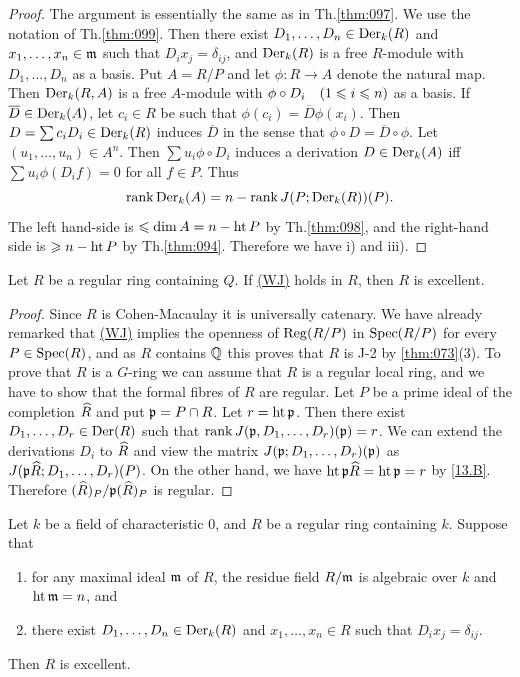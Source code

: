 \documentclass[../main]{subfiles}
\begin{document}
\begin{proof}
The argument is essentially the same as in Th.\ref{thm:097}. We use the notation of Th.\ref{thm:099}. Then there exist $D_1, \dots, D_n \in \operatorname{Der}_k(R)$ and $x_1, \dots, x_n \in \mathfrak{m}$ such that $D_i x_j = \delta_{ij}$, and $\operatorname{Der}_k(R)$ is a free $R$-module with $D_1, \ldots, D_n$ as a basis. Put $A = R/P$ and let $\phi : R \longrightarrow A$ denote the natural map. Then $\operatorname{Der}_k(R, A)$ is a free $A$-module with $\phi \circ D_i\for{1 \le i \le n}$ as a basis. If $\overline D \in \operatorname{Der}_k(A)$, let $c_i \in R$ be such that $\phi(c_i) = \overline D \phi(x_i)$. Then $D = \sum c_i D_i \in \operatorname{Der}_k(R)$ induces $\overline D$ in the sense that $\phi \circ D = \overline D \circ \phi$. Let $(u_1, \ldots, u_n) \in A^n$. Then $\sum u_i \phi \circ D_i$ induces a derivation $D \in \operatorname{Der}_k(A)$ iff $\sum u_i \phi(D_i f) = 0$ for all $f \in P$. Thus
\[
\operatorname{rank} \operatorname{Der}_k(A) = n - \operatorname{rank} J(P; \operatorname{Der}_k(R))(P).
\]
The left hand-side is $\leqslant \operatorname{dim} A = n - \operatorname{ht} P$ by Th.\ref{thm:098}, and the right-hand side is $\geqslant n - \operatorname{ht} P$ by Th.\ref{thm:094}. Therefore we have i) and iii). 
\end{proof}

\begin{theorem}\label{thm:101}
Let $R$ be a regular ring containing $Q$. If \hyperref[40.F]{(WJ)} holds in $R$, then $R$ is excellent.
\end{theorem}

\begin{proof}
Since $R$ is Cohen-Macaulay it is universally catenary. We have already remarked that \hyperref[40.F]{(WJ)} implies the openness of $\operatorname{Reg}(R/P)$ in $\operatorname{Spec}(R/P)$ for every $P \in \operatorname{Spec}(R)$, and as $R$ contains $\mathbb{Q}$ this proves that $R$ is J-2 by \ref{thm:073}(3). To prove that $R$ is a $G$-ring we can assume that $R$ is a regular local ring, and we have to show that the formal fibres of $R$ are regular. Let $P$ be a prime ideal of the completion $\widehat{R}$ and put $\mathfrak{p} = P \cap R$. Let $r = \operatorname{ht} \mathfrak{p}$. Then there exist $D_1, \dots, D_r \in \operatorname{Der}(R)$ such that $\operatorname{rank} J(\mathfrak{p}, D_1, \dots, D_r)(\mathfrak{p}) = r$. We can extend the derivations $D_i$ to $\widehat{R}$ and view the matrix $J(\mathfrak{p}; D_1, \dots, D_r)(\mathfrak{p})$ as $J(\mathfrak{p} \widehat{R}; D_1, \dots, D_r)(P)$. On the other hand, we have $\operatorname{ht} \mathfrak{p} \widehat{R} = \operatorname{ht} \mathfrak{p} = r$ by \ref{13.B}. Therefore $(\widehat{R})_P/{\mathfrak{p}}(\widehat{R})_P$ is regular.
\end{proof}

\begin{theorem}\label{thm:102}
Let $k$ be a field of characteristic $0$, and $R$ be a regular ring containing $k$. Suppose that
\begin{enumerate}[label = (\arabic*)]
    \item for any maximal ideal $\mathfrak{m}$ of $R$, the residue field $R/\mathfrak{m}$ is algebraic over $k$ and $\operatorname{ht} \mathfrak{m} = n$, and
    \item there exist $D_1, \dots, D_n \in \operatorname{Der}_k(R)$ and $x_1, \ldots, x_n \in R$ such that $D_i x_j = \delta_{ij}$.
\end{enumerate}
 Then $R$ is excellent. 
\end{theorem}
\end{document}
